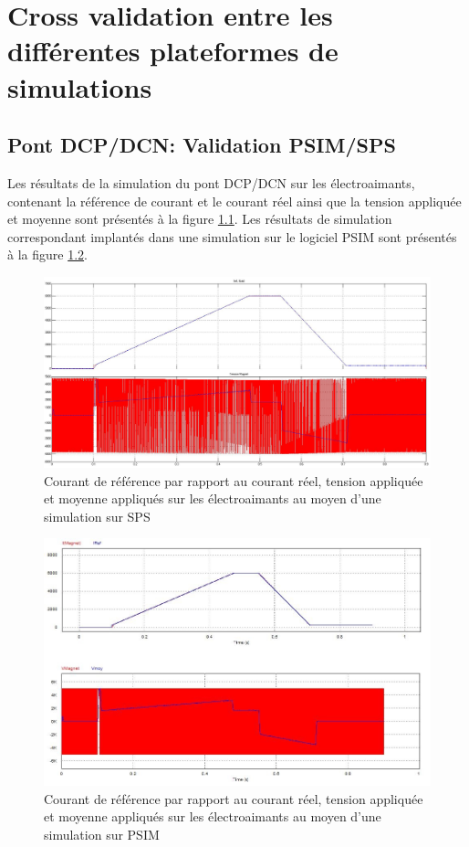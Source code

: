 \documentclass[11pt,letterpaper,final]{report}
\begin{document}
\chapter{Cross validation entre les différentes plateformes de simulations}
\section{Pont DCP/DCN: Validation PSIM/SPS}

Les résultats de la simulation du pont DCP/DCN sur les électroaimants, contenant la référence de courant et le courant réel ainsi que la tension appliquée et moyenne sont présentés à la figure \ref{figDCPDCN1}. Les résultats de simulation correspondant implantés dans une simulation sur le logiciel PSIM sont présentés à la figure \ref{figDCPDCN2}.
\begin{figure}[htb]
\centering
\includegraphics[scale=0.5]{fig/resul_sim.jpg}
\caption{Courant de référence par rapport au courant réel, tension appliquée et moyenne appliqués sur les électroaimants au moyen d'une simulation sur SPS}
\label{figDCPDCN1}
\end{figure}
\begin{figure}[htb]
\centering
\includegraphics[scale=0.6]{fig/resul_PSIM.jpg}
\caption{Courant de référence par rapport au courant réel, tension appliquée et moyenne appliqués sur les électroaimants au moyen d'une simulation sur PSIM}
\label{figDCPDCN2}
\end{figure}
\end{document}
